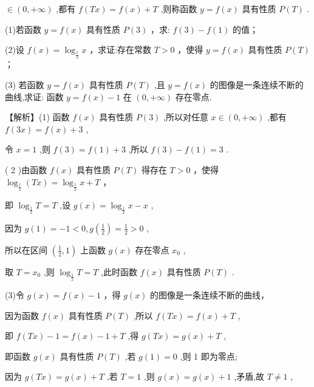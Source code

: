 \documentclass[10pt]{article}
\begin{document}
\(\in  \left( {0, + \infty }\right)\) ,都有 \(f\left( {Tx}\right)  = f\left( x\right)  + T\) ,则称函数 \(y = f\left( x\right)\) 具有性质 \(P\left( T\right)\) .

(1)若函数 \(y = f\left( x\right)\) 具有性质 \(P\left( 3\right)\) ，求: \(f\left( 3\right)  - f\left( 1\right)\) 的值；

(2)设 \(f\left( x\right)  = {\log }_{\frac{1}{2}}x\) ，求证:存在常数 \(T > 0\) ，使得 \(y = f\left( x\right)\) 具有性质 \(P\left( T\right)\) ；

(3) 若函数 \(y = f\left( x\right)\) 具有性质 \(P\left( T\right)\) ,且 \(y = f\left( x\right)\) 的图像是一条连续不断的曲线,求证: 函数 \(y = f\left( x\right)  - 1\) 在 \(\left( {0, + \infty }\right)\) 存在零点.

【解析】(1) 函数 \(f\left( x\right)\) 具有性质 \(P\left( 3\right)\) ,所以对任意 \(x \in  \left( {0, + \infty }\right)\) ,都有 \(f\left( {3x}\right)  = f\left( x\right)  + 3\) ,

令 \(x = 1\) ,则 \(f\left( 3\right)  = f\left( 1\right)  + 3\) ,所以 \(f\left( 3\right)  - f\left( 1\right)  = 3\) .

( 2 )由函数 \(f\left( x\right)\) 具有性质 \(P\left( T\right)\) 得存在 \(T > 0\) ，使得 \({\log }_{\frac{1}{2}}\left( {Tx}\right)  = {\log }_{\frac{1}{2}}x + T\) ，

即 \({\log }_{\frac{1}{2}}T = T\) ,设 \(g\left( x\right)  = {\log }_{\frac{1}{2}}x - x\) ,

因为 \(g\left( 1\right)  =  - 1 < 0,g\left( \frac{1}{2}\right)  = \frac{1}{2} > 0\) ,

所以在区间 \(\left( {\frac{1}{2},1}\right)\) 上函数 \(g\left( x\right)\) 存在零点 \({x}_{0}\) ,

取 \(T = {x}_{0}\) ,则 \({\log }_{\frac{1}{2}}T = T\) ,此时函数 \(f\left( x\right)\) 具有性质 \(P\left( T\right)\) .

(3)令 \(g\left( x\right)  = f\left( x\right)  - 1\) ，得 \(g\left( x\right)\) 的图像是一条连续不断的曲线，

因为函数 \(f\left( x\right)\) 具有性质 \(P\left( T\right)\) ,所以 \(f\left( {Tx}\right)  = f\left( x\right)  + T\) ,

即 \(f\left( {Tx}\right)  - 1 = f\left( x\right)  - 1 + T\) ,得 \(g\left( {Tx}\right)  = g\left( x\right)  + T\) ,

即函数 \(g\left( x\right)\) 具有性质 \(P\left( T\right)\) ,若 \(g\left( 1\right)  = 0\) ,则 1 即为零点;

因为 \(g\left( {Tx}\right)  = g\left( x\right)  + T\) ,若 \(T = 1\) ,则 \(g\left( x\right)  = g\left( x\right)  + 1\) ,矛盾,故 \(T \neq  1\) ,
\end{document}
